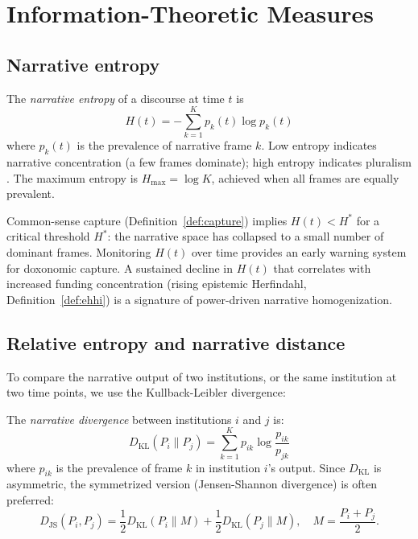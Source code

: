 \section{Information-Theoretic Measures}
\label{sec:ch17-info-theory}

\subsection{Narrative entropy}

\begin{definition}
\label{def:narrative-entropy}
The \emph{narrative entropy} of a discourse at time $t$ is
\[
  H(t) = -\sum_{k=1}^{K} p_k(t) \log p_k(t)
\]
where $p_k(t)$ is the prevalence of narrative frame $k$.
Low entropy indicates narrative concentration (a few frames dominate); high entropy indicates pluralism \autocite{shannon1948}.
The maximum entropy is $H_{\max} = \log K$, achieved when all frames are equally prevalent.
\end{definition}

\begin{proposition}
\label{prop:entropy-capture}
Common-sense capture (Definition~\ref{def:capture}) implies $H(t) < H^*$ for a critical threshold $H^*$: the narrative space has collapsed to a small number of dominant frames.
Monitoring $H(t)$ over time provides an early warning system for doxonomic capture.
A sustained decline in $H(t)$ that correlates with increased funding concentration (rising epistemic Herfindahl, Definition~\ref{def:ehhi}) is a signature of power-driven narrative homogenization.
\end{proposition}

\subsection{Relative entropy and narrative distance}

To compare the narrative output of two institutions, or the same institution at two time points, we use the Kullback-Leibler divergence:

\begin{definition}
\label{def:narrative-divergence}
The \emph{narrative divergence} between institutions $i$ and $j$ is:
\[
  D_{\text{KL}}(P_i \| P_j) = \sum_{k=1}^{K} p_{ik} \log \frac{p_{ik}}{p_{jk}}
\]
where $p_{ik}$ is the prevalence of frame $k$ in institution $i$'s output.
Since $D_{\text{KL}}$ is asymmetric, the symmetrized version (Jensen-Shannon divergence) is often preferred:
\[
  D_{\text{JS}}(P_i, P_j) = \frac{1}{2}D_{\text{KL}}(P_i \| M) + \frac{1}{2}D_{\text{KL}}(P_j \| M), \quad M = \frac{P_i + P_j}{2}.
\]
\end{definition}

